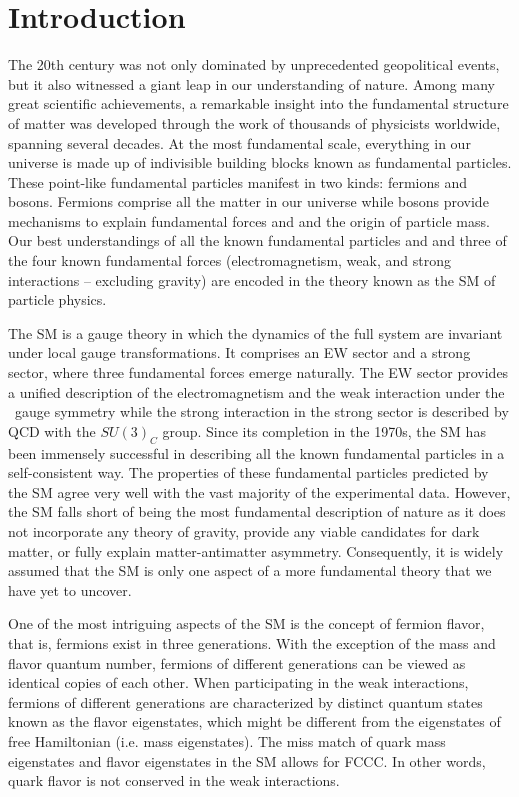 \chapter{Introduction}
\label{chap:Introduction}

The 20th century was not only dominated by unprecedented geopolitical events, but it also witnessed a giant leap in our understanding of nature. Among many great scientific achievements, a remarkable insight into the fundamental structure of matter was developed through the work of thousands of physicists worldwide, spanning several decades. At the most fundamental scale, everything in our universe is made up of indivisible building blocks known as fundamental particles. These point-like fundamental particles manifest in two kinds: fermions and bosons. Fermions comprise all the matter in our universe while bosons provide mechanisms to explain fundamental forces and and the origin of particle mass. Our best understandings of all the known fundamental particles and and three of the four known fundamental forces (electromagnetism, weak, and strong interactions -- excluding gravity) are encoded in the theory known as the \ac{SM} of particle physics.

The \ac{SM} is a gauge theory in which the dynamics of the full system are invariant under local gauge transformations. It comprises an \ac{EW} sector and a strong sector, where three fundamental forces emerge naturally. The \ac{EW} sector provides a unified description of the electromagnetism and the weak interaction under the \ew~gauge symmetry while the strong interaction in the strong sector is described by \ac{QCD} with the $SU(3)_{C}$ group. Since its completion in the 1970s, the \ac{SM} has been immensely successful in describing all the known fundamental particles in a self-consistent way. The properties of these fundamental particles predicted by the \ac{SM} agree very well with the vast majority of the experimental data. However, the \ac{SM} falls short of being the most fundamental description of nature as it does not incorporate any theory of gravity, provide any viable candidates for dark matter, or fully explain matter-antimatter asymmetry. Consequently, it is widely assumed that the \ac{SM} is only one aspect of a more fundamental theory that we have yet to uncover.

One of the most intriguing aspects of the \ac{SM} is the concept of fermion flavor, that is, fermions exist in three generations. With the exception of the mass and flavor quantum number, fermions of different generations can be viewed as identical copies of each other. When participating in the weak interactions, fermions of different generations are characterized by distinct quantum states known as the flavor eigenstates, which might be different from the eigenstates of free Hamiltonian (i.e. mass eigenstates). The miss match of quark mass eigenstates and flavor eigenstates in the \ac{SM} allows for \ac{FCCC}. In other words, quark flavor is not conserved in the weak interactions.


